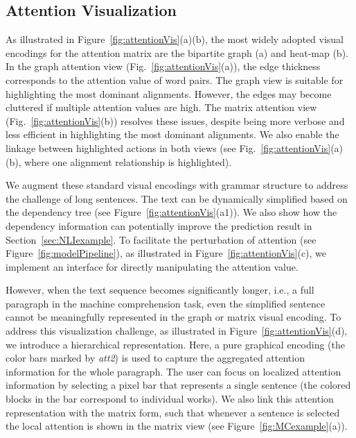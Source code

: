 \subsection{Attention Visualization}
As illustrated in Figure~\ref{fig:attentionVis}(a)(b), the most widely adopted visual encodings for the attention matrix are the bipartite graph (a) and heat-map (b). 
%
In the graph attention view (Fig.~\ref{fig:attentionVis}(a)), the edge thickness corresponds to the attention value of word pairs. %
The graph view is suitable for highlighting the most dominant alignments. However, the edges may become cluttered if multiple attention values are high. 
The matrix attention view (Fig.~\ref{fig:attentionVis}(b)) resolves these issues, despite being more verbose and less efficient in highlighting the most dominant alignments. 
We also enable the linkage between highlighted actions in both views (see Fig.~\ref{fig:attentionVis}(a)(b), where one alignment relationship is highlighted).

We augment these standard visual encodings with grammar structure to address the challenge of long sentences.
The text can be dynamically simplified based on the dependency tree (see Figure~\ref{fig:attentionVis}(a1)). We also show how the dependency information can potentially improve the prediction result in Section~\ref{sec:NLIexample}.
%
To facilitate the perturbation of attention (see Figure~\ref{fig:modelPipeline}), as illustrated in Figure~\ref{fig:attentionVis}(c), we implement an interface for directly manipulating the attention value.

However, when the text sequence becomes significantly longer, i.e., a full paragraph in the machine comprehension task,  even the simplified sentence cannot be meaningfully represented in the graph or matrix visual encoding. To address this visualization challenge, as illustrated in Figure~\ref{fig:attentionVis}(d), we introduce a hierarchical representation. Here, a pure graphical encoding (the color bars marked by \emph{att2}) is used to capture the aggregated attention information for the whole paragraph. The user can focus on localized attention information by selecting a pixel bar that represents a single sentence (the colored blocks in the bar correspond to individual works). We also link this attention representation with the matrix form, such that whenever a sentence is selected the local attention is shown in the matrix view (see Figure~\ref{fig:MCexample}(a)).

